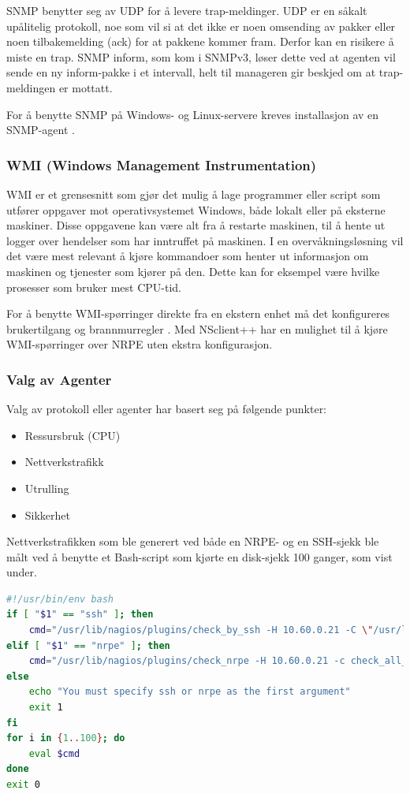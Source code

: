 SNMP benytter seg av UDP for å levere trap-meldinger. UDP er en såkalt upålitelig protokoll, noe som vil si at det ikke er noen omsending av pakker eller noen tilbakemelding (ack) for at pakkene kommer fram. Derfor kan en risikere å miste en trap. SNMP inform, som kom i SNMPv3, løser dette ved at agenten vil sende en ny inform-pakke i et intervall, helt til manageren gir beskjed om at trap-meldingen er mottatt.

For å benytte SNMP på Windows- og Linux-servere kreves installasjon av en SNMP-agent \cite{mssnmp} \cite{netsnmp}.

\subsubsection{WMI (Windows Management Instrumentation)}
WMI er et grensesnitt som gjør det mulig å lage programmer eller script som utfører oppgaver mot operativsystemet Windows, både lokalt eller på eksterne maskiner. Disse oppgavene kan være alt fra å restarte maskinen, til å hente ut logger over hendelser som har inntruffet på maskinen. I en overvåkningsløsning vil det være mest relevant å kjøre kommandoer som henter ut informasjon om maskinen og tjenester som kjører på den. Dette kan for eksempel være hvilke prosesser som bruker mest CPU-tid.

For å benytte WMI-spørringer direkte fra en ekstern enhet må det konfigureres brukertilgang og brannmurregler \cite{wmiremote}. Med NSclient++ har en mulighet til å kjøre WMI-spørringer over NRPE uten ekstra konfigurasjon.

\subsubsection{Valg av Agenter}
Valg av protokoll eller agenter har basert seg på følgende punkter:
\begin{itemize}
	\item Ressursbruk (CPU)
	\item Nettverkstrafikk
	\item Utrulling
	\item Sikkerhet
\end{itemize}
Nettverkstrafikken som ble generert ved både en NRPE- og en SSH-sjekk ble målt ved å benytte et Bash-script som kjørte en disk-sjekk 100 ganger, som vist under. 

\begin{lstlisting}[style=example,language=bash]
#!/usr/bin/env bash
if [ "$1" == "ssh" ]; then
    cmd="/usr/lib/nagios/plugins/check_by_ssh -H 10.60.0.21 -C \"/usr/lib/nagios/plugins/check_disk -W 10% -C 5% -M -A\" > /dev/null"
elif [ "$1" == "nrpe" ]; then
    cmd="/usr/lib/nagios/plugins/check_nrpe -H 10.60.0.21 -c check_all_mounts -a 10,5 > /dev/null"
else
    echo "You must specify ssh or nrpe as the first argument"
    exit 1
fi
for i in {1..100}; do
    eval $cmd
done
exit 0
\end{lstlisting}

